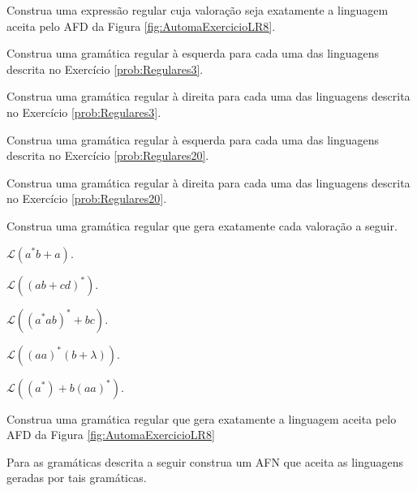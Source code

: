 \begin{problem}\label{prob:Regulares36}
	Construa uma expressão regular cuja valoração seja exatamente a linguagem aceita pelo AFD da Figura \ref{fig:AutomaExercicioLR8}.
\end{problem}

\begin{problem}\label{prob:Regulares37}
	Construa uma gramática regular à esquerda para cada uma das linguagens descrita no Exercício \ref{prob:Regulares3}.
\end{problem}

\begin{problem}\label{prob:Regulares38}
	Construa uma gramática regular à direita para cada uma das linguagens descrita no Exercício \ref{prob:Regulares3}.
\end{problem}

\begin{problem}\label{prob:Regulares39}
	Construa uma gramática regular à esquerda para cada uma das linguagens descrita no Exercício  \ref{prob:Regulares20}.
\end{problem}

\begin{problem}\label{prob:Regulares40}
	Construa uma gramática regular à direita para cada uma das linguagens descrita no Exercício  \ref{prob:Regulares20}.
\end{problem}

\begin{problem}\label{prob:Regulares41}
	Construa uma gramática regular que gera exatamente cada valoração a seguir.
\end{problem}

\begin{exerList}
	\item $\mathcal{L}(a^*b + a)$.
	\item $\mathcal{L}((ab + cd)^*)$.
	\item $\mathcal{L}((a^*ab)^* + bc)$.
	\item $\mathcal{L}((aa)^* (b + \lambda))$.
	\item $\mathcal{L}((a^*) + b(aa)^*)$.
\end{exerList}

\begin{problem}\label{prob:Regulares42}
	Construa uma gramática regular que gera exatamente a linguagem aceita pelo AFD da Figura \ref{fig:AutomaExercicioLR8}
\end{problem}

\begin{problem}\label{prob:Regulares43}
	Para as gramáticas descrita a seguir construa um AFN que aceita as linguagens geradas por tais gramáticas. 
\end{problem}

